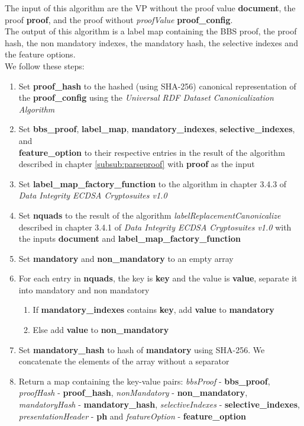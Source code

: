 \documentclass[
	a4paper               %
	,BCOR=0mm            %
	,bibliography=totoc   %
	,listof=totoc         %
	,monolingual
	,twoside=false
]{bfhthesis}              %
\begin{document}
The input of this algorithm are the VP without the proof value \textbf{document}, the proof \textbf{proof}, and the proof without \textit{proofValue} \textbf{proof\_config}.\\

The output of this algorithm is a label map containing the BBS proof, the proof hash, the non mandatory indexes, the mandatory hash, the selective indexes and the feature options.\\

We follow these steps:
\begin{enumerate}
	\item Set \textbf{proof\_hash} to the hashed (using SHA-256) canonical representation of the \textbf{proof\_config} using the \textit{Universal RDF Dataset Canonicalization Algorithm}\cite{rdf}
	\item Set \textbf{bbs\_proof}, \textbf{label\_map}, \textbf{mandatory\_indexes}, \textbf{selective\_indexes}, \textbf{} and \\\textbf{feature\_option} to their respective entries in the result of the algorithm described in chapter \ref{subsub:parseproof} with \textbf{proof} as the input
	\item Set \textbf{label\_map\_factory\_function} to the algorithm in chapter 3.4.3 of \textit{Data Integrity ECDSA Cryptosuites v1.0}\cite{ecdsa}
	\item Set \textbf{nquads} to the result of the algorithm \textit{labelReplacementCanonicalize} described in chapter 3.4.1 of \textit{Data Integrity ECDSA Cryptosuites v1.0}\cite{ecdsa} with the inputs \textbf{document} and \textbf{label\_map\_factory\_function}
	\item Set \textbf{mandatory} and \textbf{non\_mandatory} to an empty array
	\item For each entry in \textbf{nquads}, the key is \textbf{key} and the value is \textbf{value}, separate it into mandatory and non mandatory
	\begin{enumerate}
		\item If \textbf{mandatory\_indexes} contains \textbf{key}, add \textbf{value} to \textbf{mandatory}
		\item Else add \textbf{value} to \textbf{non\_mandatory}
	\end{enumerate}
	\item Set \textbf{mandatory\_hash} to hash of \textbf{mandatory} using SHA-256. We concatenate the elements of the array without a separator
	\item Return a map containing the key-value pairs: \textit{bbsProof} - \textbf{bbs\_proof}, \textit{proofHash} - \textbf{proof\_hash}, \textit{nonMandatory} - \textbf{non\_mandatory}, \textit{mandatoryHash} - \textbf{mandatory\_hash}, \textit{selectiveIndexes} - \textbf{selective\_indexes}, \textit{presentationHeader} - \textbf{ph} and \textit{featureOption} - \textbf{feature\_option}
\end{enumerate}
\end{document}
